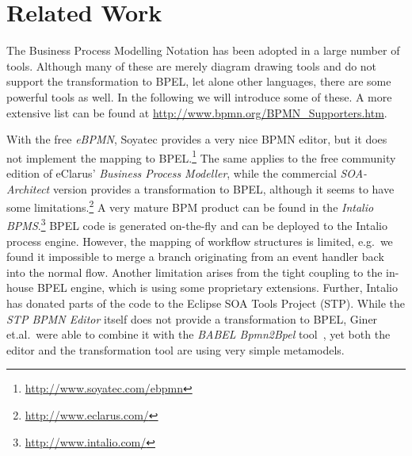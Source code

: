\section{Related Work}
\label{sec:sota}

The Business Process Modelling Notation has been adopted in a large number of tools.  Although many of these are merely diagram drawing tools and do not support the transformation to BPEL, let alone other languages, there are some powerful tools as well.  In the following we will introduce some of these.  A more extensive list can be found at \url{http://www.bpmn.org/BPMN_Supporters.htm}.

With the free \emph{eBPMN}, Soyatec provides a very nice BPMN editor, but it does not implement the mapping to BPEL.\footnote{\url{http://www.soyatec.com/ebpmn}}  The same applies to the free community edition of eClarus' \emph{Business Process Modeller}, while the commercial \emph{SOA-Architect} version provides a transformation to BPEL, although it seems to have some limitations.\footnote{\url{http://www.eclarus.com/}}
A very mature BPM product can be found in the \emph{Intalio BPMS}.\footnote{\url{http://www.intalio.com/}}  BPEL code is generated on-the-fly and can be deployed to the Intalio process engine.  However, the mapping of workflow structures is limited, e.g.\ we found it impossible to merge a branch originating from an event handler back into the normal flow.  Another limitation arises from the tight coupling to the in-house BPEL engine, which is using some proprietary extensions.  Further, Intalio has donated parts of the code to the Eclipse SOA Tools Project (STP).  While the \emph{STP BPMN Editor} itself does not provide a transformation to BPEL, Giner et.al.\ were able to combine it with the \emph{BABEL Bpmn2Bpel} tool~\cite{giner2007bridging}, yet both the editor and the transformation tool are using very simple metamodels.


